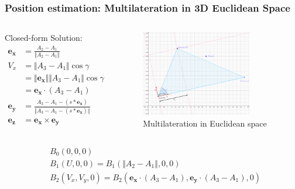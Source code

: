 \documentclass[10pt]{beamer}
\begin{document}
\begin{frame}
    \frametitle{Position estimation: Multilateration in 3D Euclidean Space}
    \begin{columns}
        Closed-form Solution:
            \begin{align*}
                \boldsymbol{e_x} &= \frac{A_2-A_1}{\Vert A_2 - A_1\Vert} \\
                V_x &= \Vert A_3 - A_1 \Vert \cos{\gamma} \\
                &= \Vert \boldsymbol{e_x} \Vert \Vert A_3 - A_1 \Vert \cos{\gamma} \\
                &= \boldsymbol{e_x} \cdot (A_3 - A_1) \\
                \boldsymbol{e_y} &= \frac{A_3-A_1-(s*\boldsymbol{e_x})}{\Vert A_3-A_1-(s*\boldsymbol{e_x})\Vert} \\
                \boldsymbol{e_z} &= \boldsymbol{e_x} \times \boldsymbol{e_y}
            \end{align*}
            \begin{figure}[H]
                \centering
                \includegraphics[width=0.8\textwidth]{multilateration.png}
                \caption{Multilateration in Euclidean space}
                \label{fig:multilateration}
            \end{figure}
    \end{columns}
    \begin{equation}
        \begin{split}
            &B_0(0,0,0) \\
            &B_1(U, 0, 0) = B_1(\Vert A_2 - A_1 \Vert, 0, 0) \\
            &B_2(V_x, V_y, 0) = B_2(\boldsymbol{e_x} \cdot (A_3 - A_1), \boldsymbol{e_y} \cdot (A_3 - A_1), 0) 
        \end{split}
        \label{eqn:multilateration_to_simplified_problem}
    \end{equation}
\end{frame}
\end{document}
